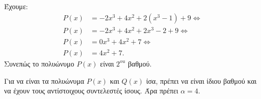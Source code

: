 \begin{alist}
\item Έχουμε:
\begin{align*}
P(x) &= -2x^3 + 4x^2 + 2(x^3 - 1) + 9 \Leftrightarrow \\
P(x) &= -2x^3 + 4x^2 + 2x^3 - 2 + 9 \Leftrightarrow \\
P(x) &= 0x^3 + 4x^2 + 7 \Leftrightarrow \\
P(x) &= 4x^2 + 7.
\end{align*}
Συνεπώς το πολυώνυμο $P(x)$ είναι $2^{ou}$ βαθμού.
\item Για να είναι τα πολυώνυμα $P(x)$ και $Q(x)$ ίσα, πρέπει να είναι ίδιου βαθμού και να έχουν τους αντίστοιχους συντελεστές ίσους. Άρα πρέπει $\alpha = 4$.
\end{alist}

